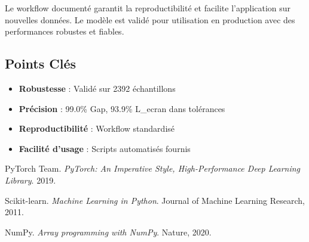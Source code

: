 \documentclass[10pt,twocolumn]{article}
\begin{document}
Le workflow documenté garantit la reproductibilité et facilite l'application sur nouvelles données. Le modèle est validé pour utilisation en production avec des performances robustes et fiables.

\subsection{Points Clés}

\begin{itemize}
    \item \textbf{Robustesse} : Validé sur 2392 échantillons
    \item \textbf{Précision} : 99.0\% Gap, 93.9\% L\_ecran dans tolérances
    \item \textbf{Reproductibilité} : Workflow standardisé
    \item \textbf{Facilité d'usage} : Scripts automatisés fournis
\end{itemize}

\begin{thebibliography}{9}
PyTorch Team. \textit{PyTorch: An Imperative Style, High-Performance Deep Learning Library}. 2019.

Scikit-learn. \textit{Machine Learning in Python}. Journal of Machine Learning Research, 2011.

NumPy. \textit{Array programming with NumPy}. Nature, 2020.
\end{thebibliography}
\end{document}
